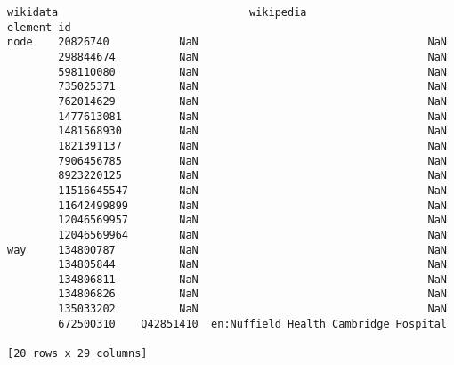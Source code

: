 \documentclass[11pt]{article}
\begin{document}
\begin{tcolorbox}[breakable, size=fbox, boxrule=.5pt, pad at break*=1mm, opacityfill=0]
\begin{Verbatim}[commandchars=\\\{\}]
                      wikidata                              wikipedia
element id
node    20826740           NaN                                    NaN
        298844674          NaN                                    NaN
        598110080          NaN                                    NaN
        735025371          NaN                                    NaN
        762014629          NaN                                    NaN
        1477613081         NaN                                    NaN
        1481568930         NaN                                    NaN
        1821391137         NaN                                    NaN
        7906456785         NaN                                    NaN
        8923220125         NaN                                    NaN
        11516645547        NaN                                    NaN
        11642499899        NaN                                    NaN
        12046569957        NaN                                    NaN
        12046569964        NaN                                    NaN
way     134800787          NaN                                    NaN
        134805844          NaN                                    NaN
        134806811          NaN                                    NaN
        134806826          NaN                                    NaN
        135033202          NaN                                    NaN
        672500310    Q42851410  en:Nuffield Health Cambridge Hospital

[20 rows x 29 columns]
\end{Verbatim}
\end{tcolorbox}
        
\end{document}
